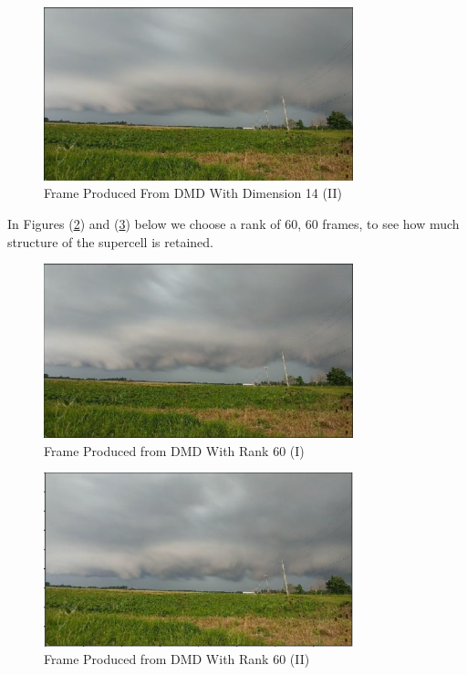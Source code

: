 \documentclass[12pt]{report}
\begin{document}
\begin{figure}[H]
    \centering
    \includegraphics[width=0.8\textwidth]{Weather pics/WS13.png}
    \caption{Frame Produced From DMD With Dimension 14 (II)} \label{fig:WS13}
\end{figure}
\noindent

In Figures (\ref{fig:WS14}) and (\ref{fig:WS15}) below we choose a rank of 60, 60 frames, to see how much structure of the supercell is retained. 

\begin{figure}[H]
    \centering
    \includegraphics[width=0.8\textwidth]{Weather pics/WS14.png}
    \caption{Frame Produced from DMD With Rank 60 (I)} \label{fig:WS14}
\end{figure}
\noindent

\begin{figure}[H]
    \centering
    \includegraphics[width=0.8\textwidth]{Weather pics/WS15.png}
    \caption{Frame Produced from DMD With Rank 60 (II)} \label{fig:WS15}
\end{figure}
\noindent
\end{document}
